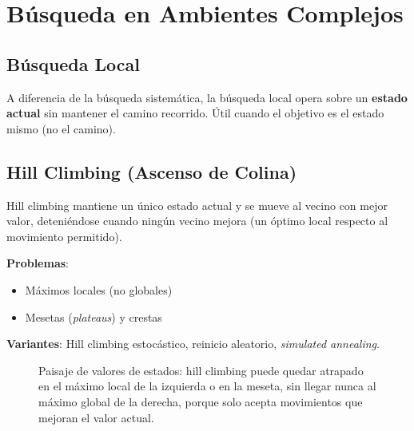 \section{Búsqueda en Ambientes Complejos}

\subsection{Búsqueda Local}

A diferencia de la búsqueda sistemática, la búsqueda local opera sobre un \textbf{estado actual} sin mantener el camino recorrido. Útil cuando el objetivo es el estado mismo (no el camino).

\subsection{Hill Climbing (Ascenso de Colina)}

Hill climbing mantiene un único estado actual y se mueve al vecino con mejor valor, deteniéndose cuando ningún
vecino mejora (un óptimo local respecto al movimiento permitido).

\textbf{Problemas}:
\begin{itemize}
    \item Máximos locales (no globales)
    \item Mesetas (\textit{plateaus}) y crestas
\end{itemize}

\textbf{Variantes}: Hill climbing estocástico, reinicio aleatorio, \textit{simulated annealing}.

\begin{figure}[H]
\centering
{}
\caption{Paisaje de valores de estados: hill climbing puede quedar atrapado en el máximo local de la izquierda o en
la meseta, sin llegar nunca al máximo global de la derecha, porque solo acepta movimientos que mejoran el valor
actual.}
\end{figure}


